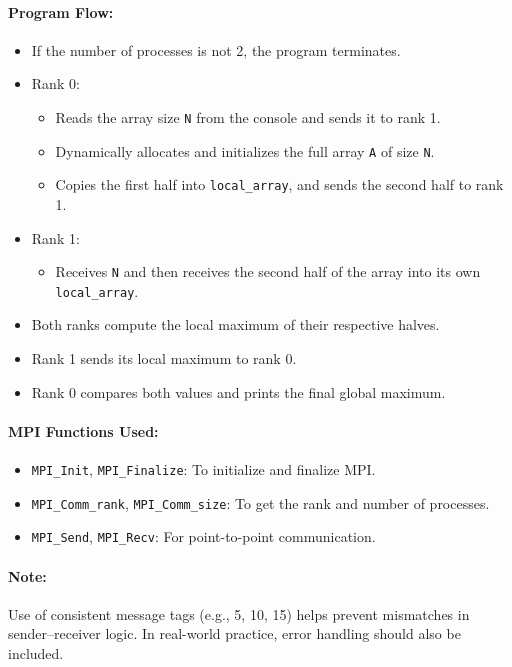 \documentclass[12pt]{book}
\begin{document}
\paragraph{Program Flow:}
\begin{itemize}
    \item If the number of processes is not 2, the program terminates.
    \item Rank 0:
        \begin{itemize}
            \item Reads the array size \texttt{N} from the console and sends it to rank 1.
            \item Dynamically allocates and initializes the full array \texttt{A} of size \texttt{N}.
            \item Copies the first half into \texttt{local\_array}, and sends the second half to rank 1.
        \end{itemize}
    \item Rank 1:
        \begin{itemize}
            \item Receives \texttt{N} and then receives the second half of the array into its own \texttt{local\_array}.
        \end{itemize}
    \item Both ranks compute the local maximum of their respective halves.
    \item Rank 1 sends its local maximum to rank 0.
    \item Rank 0 compares both values and prints the final global maximum.
\end{itemize}

\paragraph{MPI Functions Used:}
\begin{itemize}
    \item \texttt{MPI\_Init}, \texttt{MPI\_Finalize}: To initialize and finalize MPI.
    \item \texttt{MPI\_Comm\_rank}, \texttt{MPI\_Comm\_size}: To get the rank and number of processes.
    \item \texttt{MPI\_Send}, \texttt{MPI\_Recv}: For point-to-point communication.
\end{itemize}

\paragraph{Note:} Use of consistent message tags (e.g., 5, 10, 15) helps prevent mismatches in sender–receiver logic. In real-world practice, error handling should also be included.
\end{document}
